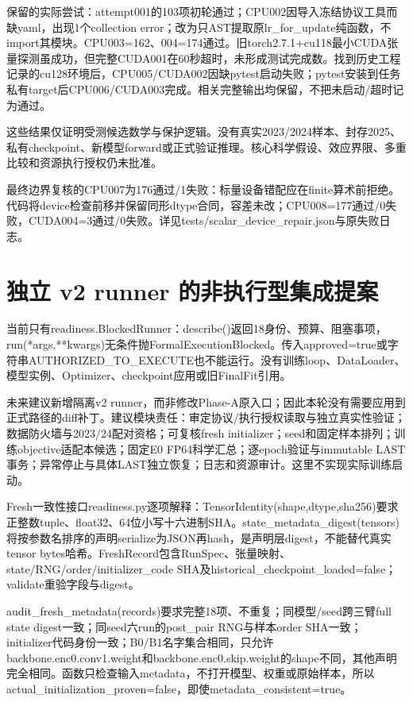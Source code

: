 \documentclass[UTF8,fontset=fandol,10pt]{ctexart}
\begin{document}
保留的实际尝试：attempt001的103项初轮通过；CPU002因导入冻结协议工具而缺yaml，出现1个collection error；改为只AST提取原lr\_\allowbreak{}for\_\allowbreak{}update纯函数，不import其模块。CPU003=162、004=174通过。旧torch2.7.1+cu118最小CUDA张量探测虽成功，但完整CUDA001在60秒超时，未形成测试完成数。找到历史工程记录的cu128环境后，CPU005/\allowbreak{}CUDA002因缺pytest启动失败；pytest安装到任务私有target后CPU006/\allowbreak{}CUDA003完成。相关完整输出均保留，不把未启动/\allowbreak{}超时记为通过。

这些结果仅证明受测候选数学与保护逻辑。没有真实2023/\allowbreak{}2024样本、封存2025、私有checkpoint、新模型forward或正式验证推理。核心科学假设、效应界限、多重比较和资源执行授权仍未批准。

最终边界复核的CPU007为176通过/\allowbreak{}1失败：标量设备错配应在finite算术前拒绝。代码将device检查前移并保留同形dtype合同，容差未改；CPU008=177通过/\allowbreak{}0失败，CUDA004=3通过/\allowbreak{}0失败。详见tests/\allowbreak{}scalar\_\allowbreak{}device\_\allowbreak{}repair.json与原失败日志。
\clearpage\section{独立 v2 runner 的非执行型集成提案}

当前只有readiness.BlockedRunner：describe()返回18身份、预算、阻塞事项，run(*args,**kwargs)无条件抛FormalExecutionBlocked。传入approved=true或字符串AUTHORIZED\_\allowbreak{}TO\_\allowbreak{}EXECUTE也不能运行。没有训练loop、DataLoader、模型实例、Optimizer、checkpoint应用或旧FinalFit引用。

未来建议新增隔离v2 runner，而非修改Phase-A原入口；因此本轮没有需要应用到正式路径的diff补丁。建议模块责任：审定协议/\allowbreak{}执行授权读取与独立真实性验证；数据防火墙与2023/\allowbreak{}24配对资格；可复核fresh initializer；seed和固定样本排列；训练objective适配本候选；固定E0 FP64科学汇总；逐epoch验证与immutable LAST事务；异常停止与具体LAST独立恢复；日志和资源审计。这里不实现实际训练启动。

Fresh一致性接口readiness.py逐项解释：TensorIdentity(shape,dtype,sha256)要求正整数tuple、float32、64位小写十六进制SHA。state\_\allowbreak{}metadata\_\allowbreak{}digest(tensors)将按参数名排序的声明serialize为JSON再hash，是声明层digest，不能替代真实tensor bytes哈希。FreshRecord包含RunSpec、张量映射、state/\allowbreak{}RNG/\allowbreak{}order/\allowbreak{}initializer\_\allowbreak{}code SHA及historical\_\allowbreak{}checkpoint\_\allowbreak{}loaded=false；validate重验字段与digest。

audit\_\allowbreak{}fresh\_\allowbreak{}metadata(records)要求完整18项、不重复；同模型/\allowbreak{}seed跨三臂full state digest一致；同seed六run的post\_\allowbreak{}pair RNG与样本order SHA一致；initializer代码身份一致；B0/\allowbreak{}B1名字集合相同，只允许backbone.enc0.conv1.weight和backbone.enc0.skip.weight的shape不同，其他声明完全相同。函数只检查输入metadata，不打开模型、权重或原始样本，所以actual\_\allowbreak{}initialization\_\allowbreak{}proven=false，即使metadata\_\allowbreak{}consistent=true。
\end{document}
